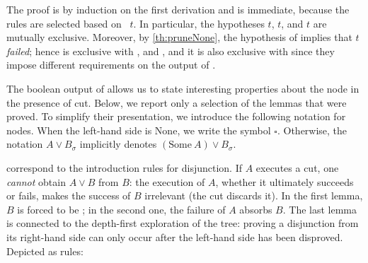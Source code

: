 

The proof is by induction on the first \runT derivation and is immediate,
because the rules are selected based on \pathend\ $t$. In particular, the
hypotheses \success $t$, \incomplete $t$, and \failed $t$ are
mutually exclusive. Moreover, by \cref{th:pruneNone}, the hypothesis of
\failt implies that $t$ \emph{failed}; hence \failt is exclusive
with \stopot, \stopt and \stept, and it is also exclusive with
\backt since they impose different requirements on the output of \na.

The boolean output of \runT allows us to state interesting properties about the
\orC node in the presence of cut. Below, we report only a selection of the
lemmas that were proved. To simplify their presentation, we introduce the
following notation for \orC nodes. When the left-hand side is $\mathrm{None}$,
we write the symbol $\square$. Otherwise, the notation $A \lor B_\sigma$
implicitly denotes $(\mathrm{Some}\ A) \lor B_\sigma$.





 correspond to the introduction rules
for disjunction. If $A$ executes a cut, one \emph{cannot} obtain $A \lor B$ from
$B$: the execution of $A$, whether it ultimately succeeds or fails, makes the
success of $B$ irrelevant (the cut discards it). In the first lemma, $B$ is
forced to be \koC; in the second one, the failure of $A$ absorbs $B$. The last
lemma is connected to the depth-first exploration of the tree: proving a
disjunction from its right-hand side can only occur after the left-hand side
has been disproved.
Depicted as rules:
%
\begin{center}  

\begin{bprooftree}
\end{bprooftree}
\begin{bprooftree}
\end{bprooftree}

\vspace{18pt}

\begin{bprooftree}
\end{bprooftree}
\end{center}


